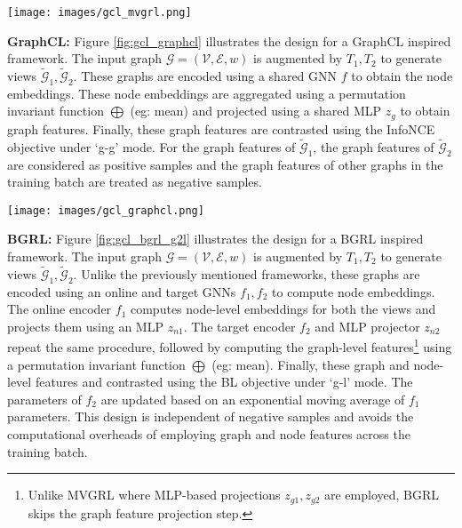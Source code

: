 \documentclass{article}
\def\gE{{\mathcal{E}}}
\def\gG{{\mathcal{G}}}
\def\gV{{\mathcal{V}}}
\theoremstyle{plain}
\theoremstyle{definition}
\theoremstyle{remark}
\begin{document}
\begin{figure*}[ht]
\vskip 0.2in
\begin{center}
\centerline{\texttt{[image: images/gcl\_mvgrl.png]}}
\caption{MVGRL design with dedicated encoders $f_1, f_2$, shared node feature projector $z_n$, shared graph feature projector $z_g$, g-l contrastive mode and JSD objective.} 
\label{fig:gcl_mvgrl}
\end{center}
\vskip -0.2in
\end{figure*}

\textbf{GraphCL:} Figure \ref{fig:gcl_graphcl} illustrates the design for a GraphCL \citep{you2020graph} inspired framework. The input graph $\gG=(\gV, \gE, w)$ is augmented by $T_1, T_2$ to generate views $\widetilde{\gG}_1, \widetilde{\gG}_2$. These graphs are encoded using a shared GNN $f$ to obtain the node embeddings. These node embeddings are aggregated using a permutation invariant function $\bigoplus$ (eg: mean) and projected using a shared MLP $z_g$ to obtain graph features. Finally, these graph features are contrasted using the InfoNCE objective under `g-g' mode. For the graph features of $\widetilde{\gG}_1$, the graph features of $\widetilde{\gG}_2$ are considered as positive samples and the graph features of other graphs in the training batch are treated as negative samples.
 
\begin{figure*}[ht]
\vskip 0.2in
\begin{center}
\centerline{\texttt{[image: images/gcl\_graphcl.png]}}
\caption{GraphCL design with shared encoder $f$, shared graph feature projector $z_g$, g-g contrastive mode and InfoNCE objective.} 
\label{fig:gcl_graphcl}
\end{center}
\vskip -0.2in
\end{figure*}

\textbf{BGRL:} Figure \ref{fig:gcl_bgrl_g2l} illustrates the design for a BGRL \citep{thakoor2021bootstrapped} inspired framework. The input graph $\gG=(\gV, \gE, w)$ is augmented by $T_1, T_2$ to generate views $\widetilde{\gG}_1, \widetilde{\gG}_2$. Unlike the previously mentioned frameworks, these graphs are encoded using an online and target GNNs $f_1, f_2$ to compute node embeddings. The online encoder $f_1$ computes node-level embeddings for both the views and projects them using an MLP $z_{n1}$. The target encoder $f_2$ and MLP projector $z_{n2}$ repeat the same procedure, followed by computing the graph-level features\footnote{Unlike MVGRL where MLP-based projections $z_{g1}, z_{g2}$ are employed, BGRL skips the graph feature projection step.} using a permutation invariant function $\bigoplus$ (eg: mean). Finally, these graph and node-level features and contrasted using the BL objective under `g-l' mode. The parameters of $f_2$ are updated based on an exponential moving average of $f_1$ parameters. This design is independent of negative samples and avoids the computational overheads of employing graph and node features across the training batch.
\end{document}
